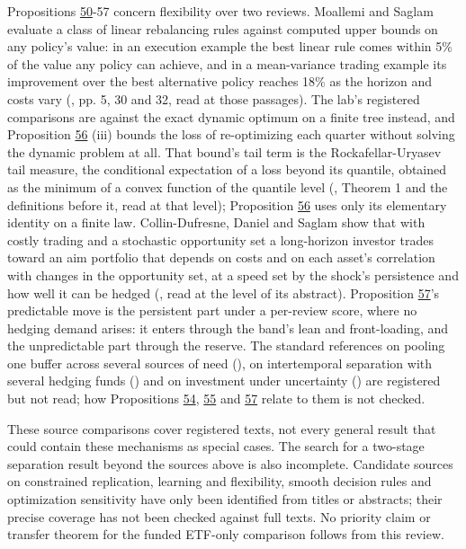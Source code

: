 \documentclass[11pt]{article}
\begin{document}
Propositions \hyperref[res:Proposition-50]{50}-57 concern flexibility over two reviews. Moallemi and
Saglam evaluate a class of linear rebalancing rules against computed
upper bounds on any policy's value: in an execution example the best
linear rule comes within 5\% of the value any policy can achieve, and in
a mean-variance trading example its improvement over the best
alternative policy reaches 18\% as the horizon and costs vary
(\cite{moallemi2015dynamic}, pp. 5, 30 and 32, read at those passages). The
lab's registered comparisons are against the exact dynamic optimum on a
finite tree instead, and Proposition \hyperref[res:Proposition-56]{56} (iii) bounds the loss of
re-optimizing each quarter without solving the dynamic problem at all.
That bound's tail term is the Rockafellar-Uryasev tail measure, the
conditional expectation of a loss beyond its quantile, obtained as the
minimum of a convex function of the quantile level
(\cite{rockafellar2000optimization}, Theorem 1 and the definitions before
it, read at that level); Proposition \hyperref[res:Proposition-56]{56} uses only its elementary
identity on a finite law. Collin-Dufresne, Daniel and Saglam show that
with costly trading and a stochastic opportunity set a long-horizon
investor trades toward an aim portfolio that depends on costs and on
each asset's correlation with changes in the opportunity set, at a
speed set by the shock's persistence and how well it can be hedged
(\cite{collindufresne2024optimal}, read at the level of its abstract).
Proposition \hyperref[res:Proposition-57]{57}'s predictable move is the persistent part under a
per-review score, where no hedging demand arises: it enters through
the band's lean and front-loading, and the unpredictable part through
the reserve. The standard references on pooling one buffer across
several sources of need (\cite{eppen1979effects}), on intertemporal
separation with several hedging funds (\cite{merton1973intertemporal}) and
on investment under uncertainty (\cite{dixitpindyck1994investment}) are
registered but not read; how Propositions \hyperref[res:Proposition-54]{54}, \hyperref[res:Proposition-55]{55} and \hyperref[res:Proposition-57]{57} relate to them
is not checked.

These source comparisons cover registered texts, not every
general result that could contain these mechanisms as special
cases. The search for a two-stage separation result beyond the
sources above is also incomplete. Candidate sources on constrained replication,
learning and flexibility,
smooth decision rules and optimization sensitivity have only been
identified from titles or abstracts; their precise coverage has
not been checked against full texts. No priority claim or transfer
theorem for the funded ETF-only comparison follows from this review.
\end{document}
